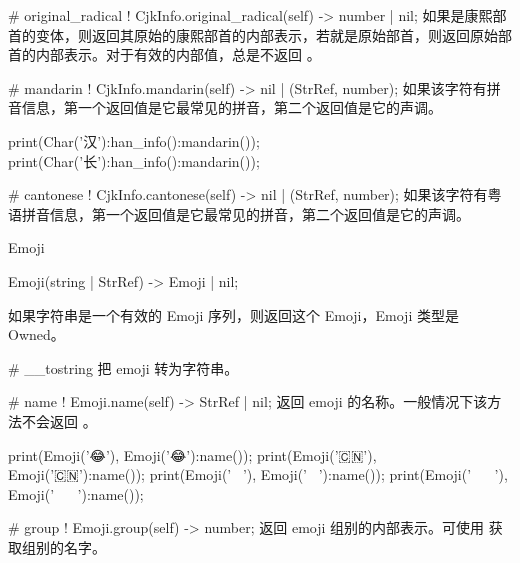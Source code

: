\documentclass[class=article,doc={kv-usage}]{cusdoc}
\begin{document}
\begin{luadoc*}{}
# original_radical
! CjkInfo.original_radical(self) -> number | nil;
如果是康熙部首的变体，则返回其原始的康熙部首的内部表示，若就是原始部首，则返回原始部首的内部表示。对于有效的内部值，总是不返回 。
\end{luadoc*}

\begin{luadoc*}{}
# mandarin
! CjkInfo.mandarin(self) -> nil | (StrRef, number);
如果该字符有拼音信息，第一个返回值是它最常见的拼音，第二个返回值是它的声调。
\end{luadoc*}

\begin{luarun}{}
print(Char('汉'):han_info():mandarin());
print(Char('长'):han_info():mandarin());
\end{luarun}

\begin{luadoc*}{}
# cantonese
! CjkInfo.cantonese(self) -> nil | (StrRef, number);
如果该字符有粤语拼音信息，第一个返回值是它最常见的拼音，第二个返回值是它的声调。
\end{luadoc*}

\begin{luadoc}[global]{Emoji}
  \begin{luasyntax}
    Emoji(string | StrRef) -> Emoji | nil;
  \end{luasyntax}
如果字符串是一个有效的 Emoji 序列，则返回这个 Emoji，Emoji 类型是 Owned。
\end{luadoc}

\begin{luadoc*}{}
# __tostring
把 emoji 转为字符串。
\end{luadoc*}

\begin{luadoc*}{}
# name
! Emoji.name(self) -> StrRef | nil;
返回 emoji 的名称。一般情况下该方法不会返回 。
\end{luadoc*}

\begin{luarun}{}
print(Emoji('😂'), Emoji('😂'):name());
print(Emoji('🇨🇳'), Emoji('🇨🇳'):name());
print(Emoji('🤦🏻‍♀️'), Emoji('🤦🏻‍♀️'):name());
print(Emoji('👩🏻‍❤️‍💋‍👨🏻'), Emoji('👩🏻‍❤️‍💋‍👨🏻'):name());
\end{luarun}

\begin{luadoc*}{}
# group
! Emoji.group(self) -> number;
返回 emoji 组别的内部表示。可使用  获取组别的名字。
\end{luadoc*}
\end{document}
